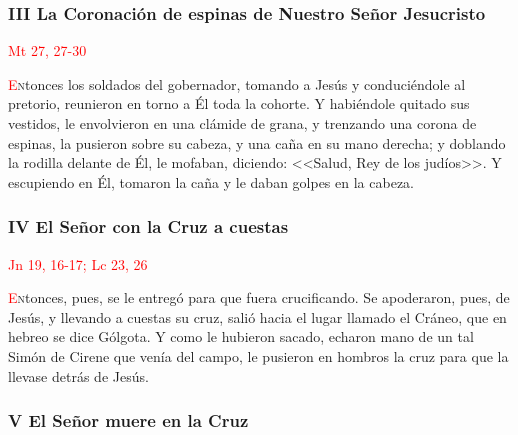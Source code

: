 \documentclass[10pt,twoside]{book}
\begin{document}
\vspace{0.5em}



\noindent\subsubsection*{III La Coronación de espinas de Nuestro Señor Jesucristo}

\vspace{-0.5em}

\hfill\textcolor{red}{Mt 27, 27-30}

\lettrine[lines=2]{\textcolor{red}{E}}ntonces los soldados del gobernador, tomando a Jesús y conduciéndole al pretorio, reunieron en torno a Él toda la cohorte. 
Y habiéndole quitado sus vestidos, le envolvieron en una clámide de grana, y trenzando una corona de espinas, la pusieron sobre su cabeza, 
y una caña en su mano derecha; y doblando la rodilla delante de Él, le mofaban, diciendo: <<Salud, Rey de los judíos>>. Y escupiendo en Él, 
tomaron la caña y le daban golpes en la cabeza.

\vspace{0.5em}



\noindent\subsubsection*{IV El Señor con la Cruz a cuestas}

\vspace{-0.5em}

\hfill\textcolor{red}{Jn 19, 16-17; Lc 23, 26}

\lettrine[lines=2]{\textcolor{red}{E}}ntonces, pues, se le entregó para que fuera crucificando. Se apoderaron, pues, de Jesús, y llevando a cuestas su cruz, 
salió hacia el lugar llamado el Cráneo, que en hebreo se dice Gólgota. Y como le hubieron sacado, echaron mano de un tal Simón de Cirene que venía del campo, 
le pusieron en hombros la cruz para que la llevase detrás de Jesús.

\vspace{0.5em}



\noindent\subsubsection*{V El Señor muere en la Cruz}
\end{document}
